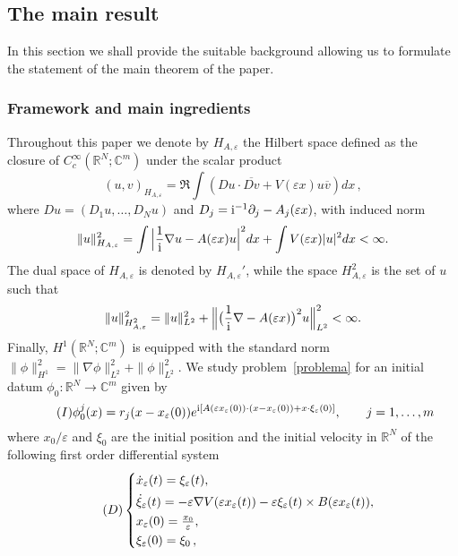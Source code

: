 \documentclass[11pt]{amsart}
\numberwithin{equation}{section}
\theoremstyle{definition}
\begin{document}
\subsection{The main result}
\label{preliminari}

In this section we shall provide the suitable background
allowing us to formulate the statement of the main theorem of the paper.

\subsubsection{Framework and main ingredients}
Throughout this paper we denote by $H_{A,{\varepsilon}}$ the Hilbert space
defined as the closure of $C^\infty_c({{\mathbb R}}^N;{{\mathbb C}}^m)$ under the scalar
product
$$
(u,v)_{H_{A,{\varepsilon}}}=\Re\int(D u\cdot \overline{D
v}+V({\varepsilon} x)u\overline{v})dx\,,
$$
where $Du=(D_1u,\dots,D_Nu)$ and $D_j={{\rm i}}^{-1}\partial_j-A_j({\varepsilon} x)$, with induced norm
$$
\|u\|_{H_{A,{\varepsilon}}}^2=\int\Big|\frac{1}{{\rm i}}\nabla
u-A({\varepsilon} x)u\Big|^2dx+\int V({\varepsilon} x)|u|^2dx<\infty.
$$
The dual space of $H_{A,{\varepsilon}}$ is denoted by $H_{A,{\varepsilon}}'$,
while the space $H_{A,{\varepsilon}}^2$ is the set of $u$ such that
$$
\|u\|_{H_{A,{\varepsilon}}^2}^2=\|u\|_{L^2}^2+\Big\|\big(\frac{1}{{\rm i}}\nabla-A({\varepsilon} x)\big)^2u\Big\|_{L^2}^2<\infty.
$$
Finally, $H^1({{\mathbb R}}^N;{{\mathbb C}}^m)$ is equipped with
the standard norm $\|\phi\|_{H^1}^2=\|\nabla\phi\|_{L^2}^2+\|\phi\|_{L^2}^2$.
We study problem~\eqref{problema} for an initial datum $\phi_0:{{\mathbb R}}^N\to{{\mathbb C}}^m$ given by
\begin{equation} \label{initialD} \tag{$I$}
\phi_0^j(x)=r_j(x-x_{\varepsilon}(0))
e^{{{\rm i}}[A({\varepsilon} x_{\varepsilon}(0))\cdot(x-x_{\varepsilon}(0))+x\cdot\xi_{\varepsilon}(0)]},\qquad j=1,\dots,m
\end{equation}
where $x_0/{\varepsilon}$ and $\xi_0$ are the initial position and the initial
velocity in ${{\mathbb R}}^N$ of the following first order differential system
\begin{equation}
    \label{DriveS}
\tag{$D$}
    \begin{cases}
        \dot x_{\varepsilon}(t)=\xi_{\varepsilon}(t), & \\
        \noalign{\vskip3pt}
        \dot \xi_{\varepsilon}(t)=-{\varepsilon}\nabla V({\varepsilon} x_{\varepsilon}(t))-{\varepsilon}\xi_{\varepsilon}(t)\times B({\varepsilon} x_{\varepsilon}(t)), & \\
        \noalign{\vskip1pt}
        x_{\varepsilon}(0)=\frac{x_0}{\varepsilon}, &\\
        \noalign{\vskip1pt}
        \xi_{\varepsilon}(0)=\xi_0\,, &
    \end{cases}
\end{equation}
\end{document}
